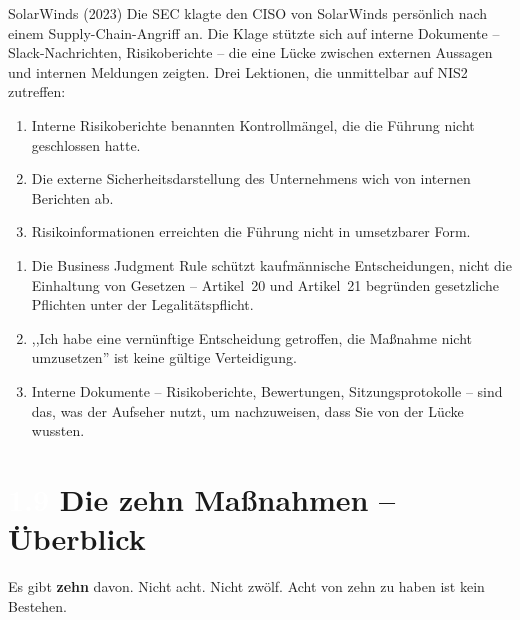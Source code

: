\documentclass[11pt,a4paper,twoside]{book}
\newcommand{\lessontag}[1]{%
  \texorpdfstring{%
    \setlength{\fboxsep}{3pt}\colorbox{nisd2blue}{\textcolor{white}{\footnotesize\bfseries #1}}\quad%
  }{Lektion #1\ }%
}
\begin{document}
\begin{casestudy}{SolarWinds (2023)}
Die SEC klagte den CISO von SolarWinds persönlich nach einem Supply-Chain-Angriff an. Die Klage stützte sich auf interne Dokumente -- Slack-Nachrichten, Risikoberichte -- die eine Lücke zwischen externen Aussagen und internen Meldungen zeigten. Drei Lektionen, die unmittelbar auf NIS2 zutreffen:
\begin{enumerate}
  \item Interne Risikoberichte benannten Kontrollmängel, die die Führung nicht geschlossen hatte.
  \item Die externe Sicherheitsdarstellung des Unternehmens wich von internen Berichten ab.
  \item Risikoinformationen erreichten die Führung nicht in umsetzbarer Form.
\end{enumerate}
\end{casestudy}

\begin{keytakeaways}
\begin{enumerate}
  \item Die Business Judgment Rule schützt kaufmännische Entscheidungen, nicht die Einhaltung von Gesetzen -- Artikel~20 und Artikel~21 begründen gesetzliche Pflichten unter der Legalitätspflicht.
  \item ,,Ich habe eine vernünftige Entscheidung getroffen, die Maßnahme nicht umzusetzen'' ist keine gültige Verteidigung.
  \item Interne Dokumente -- Risikoberichte, Bewertungen, Sitzungsprotokolle -- sind das, was der Aufseher nutzt, um nachzuweisen, dass Sie von der Lücke wussten.
\end{enumerate}
\end{keytakeaways}

\section{\lessontag{1.9}Die zehn Maßnahmen -- Überblick}

Es gibt \textbf{zehn} davon. Nicht acht. Nicht zwölf. Acht von zehn zu haben ist kein Bestehen.
\end{document}
